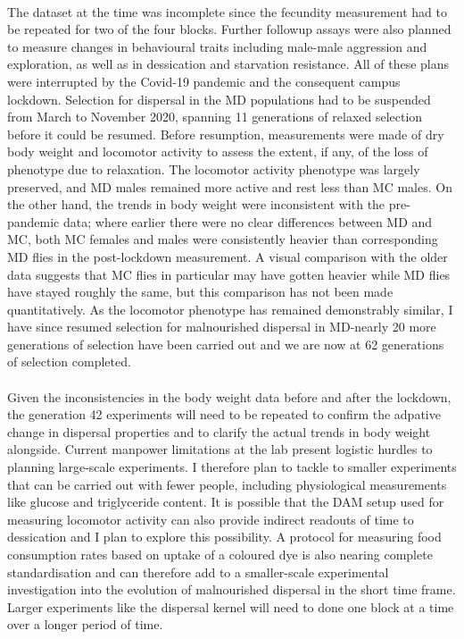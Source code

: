 \documentclass[12pt,onecolumn,twoside]{article}
\begin{document}
	\paragraph{\empty}The dataset at the time was incomplete since the fecundity measurement had to be repeated for two of the four blocks. Further followup assays were also planned to measure changes in behavioural traits including male-male aggression and exploration, as well as in dessication and starvation resistance. %
	All of these plans were interrupted by the Covid-19 pandemic and the consequent campus lockdown. Selection for dispersal in the MD populations had to be suspended from March to November 2020, spanning 11 generations of relaxed selection before it could be resumed. Before resumption, measurements were made of dry body weight and locomotor activity to assess the extent, if any, of the loss of phenotype due to relaxation. The locomotor activity phenotype was largely preserved, and MD males remained more active and rest less than MC males. On the other hand, the trends in body weight were inconsistent with the pre-pandemic data; where earlier there were no clear differences between MD and MC, both MC females and males were consistently heavier than corresponding MD flies in the post-lockdown measurement. A visual comparison with the older data suggests that MC flies in particular may have gotten heavier while MD flies have stayed roughly the same, but this comparison has not been made quantitatively. As the locomotor phenotype has remained demonstrably similar, I have since resumed selection for malnourished dispersal in MD-nearly 20 more generations of selection have been carried out and we are now at 62 generations of selection completed.

	\paragraph{\empty}Given the inconsistencies in the body weight data before and after the lockdown, the generation 42 experiments will need to be repeated to confirm the adpative change in dispersal properties and to clarify the actual trends in body weight alongside. Current manpower limitations at the lab present logistic hurdles to planning large-scale experiments. I therefore plan to tackle to smaller experiments that can be carried out with fewer people, including physiological measurements like glucose and triglyceride content. It is possible that the DAM setup used for measuring locomotor activity can also provide indirect readouts of time to dessication and I plan to explore this possibility. A protocol for measuring food consumption rates based on uptake of a coloured dye is also nearing complete standardisation and can therefore add to a smaller-scale experimental investigation into the evolution of malnourished dispersal in the short time frame. Larger experiments like the dispersal kernel will need to done one block at a time over a longer period of time.
\end{document}
